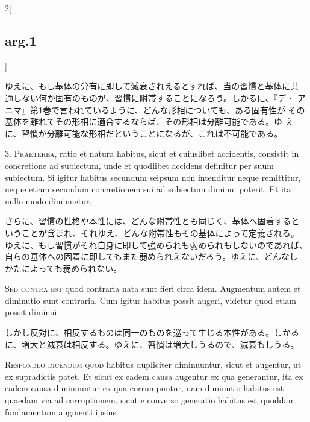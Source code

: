\documentclass[paper=a4paper,fontsize=10pt,jafontsize=9pt,titlepage]{jlreq}
\begin{document}
\begin{paracol}{2}[\subsection{arg.1}]
\switchcolumn

ゆえに、もし基体の分有に即して減衰されえるとすれば、当の習慣と基体に共
通しない何か固有のものが、習慣に附帯することになろう。しかるに、『デ・
アニマ』第1巻で言われているように、どんな形相についても、ある固有性が
その基体を離れてその形相に適合するならば、その形相は分離可能である。ゆ
えに、習慣が分離可能な形相だということになるが、これは不可能である。


3. {\scshape Praeterea}, ratio et natura habitus, sicut et cuiuslibet
accidentis, consistit in concretione ad subiectum, unde et quodlibet
accidens definitur per suum subiectum. Si igitur habitus secundum
seipsum non intenditur neque remittitur, neque etiam secundum
concretionem sui ad subiectum diminui poterit. Et ita nullo modo
diminuetur.

\switchcolumn

さらに、習慣の性格や本性には、どんな附帯性とも同じく、基体へ固着すると
いうことが含まれ、それゆえ、どんな附帯性もその基体によって定義される。
ゆえに、もし習慣がそれ自身に即して強められも弱められもしないのであれば、
自らの基体への固着に即してもまた弱められえないだろう。ゆえに、どんなし
かたによっても弱められない。

\switchcolumn*[\subsection{s.c.}]

{\scshape Sed contra est} quod contraria nata sunt fieri circa
idem. Augmentum autem et diminutio sunt contraria. Cum igitur habitus
possit augeri, videtur quod etiam possit diminui.

\switchcolumn

しかし反対に、相反するものは同一のものを巡って生じる本性がある。しかる
に、増大と減衰は相反する。ゆえに、習慣は増大しうるので、減衰もしうる。


{\scshape Respondeo dicendum quod} habitus dupliciter diminuuntur,
sicut et augentur, ut ex supradictis patet. Et sicut ex eadem causa
augentur ex qua generantur, ita ex eadem causa diminuuntur ex qua
corrumpuntur, nam diminutio habitus est quaedam via ad corruptionem,
sicut e converso generatio habitus est quoddam fundamentum augmenti
ipsius.


\end{paracol}
\end{document}
